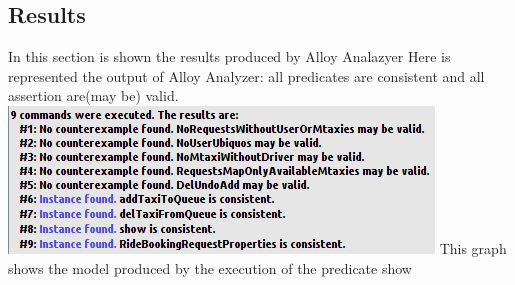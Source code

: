 \documentclass[11pt,titlepage]{article} %
\begin{document}
	\subsection{Results}
		In this section is shown the results produced by Alloy Analazyer\newline\newline
		\noindent
		Here is represented the output of Alloy Analyzer: all predicates are consistent and all assertion are(may be) valid. \newline\newline
		\includegraphics[scale=0.8]{results.png}
		\newpage
		This graph shows the model produced by the execution of the predicate show
\end{document}
